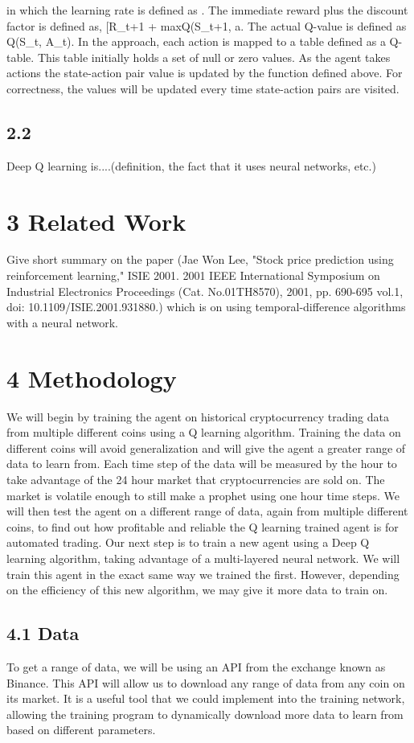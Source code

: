 \documentclass[letterpaper]{article}
\begin{document}
in which the learning rate is defined as \alpha. The immediate reward plus the discount factor is defined as, [R_{t+1} + \gamma maxQ(S_{t+1, a}. The actual Q-value is defined as Q(S_{t}, A_{t}).
In the approach, each action is mapped to a table defined as a Q-table. This table initially holds a set of null or zero values. As the agent takes actions the state-action pair value is updated by the function defined above. For correctness, the values will be updated every time state-action pairs are visited. 

\subsection{2.2} 
Deep Q learning is....(definition, the fact that it uses neural networks, etc.)

\section{3 Related Work}
Give short summary on the paper (Jae Won Lee, "Stock price prediction using reinforcement learning," ISIE 2001. 2001 IEEE International Symposium on Industrial Electronics Proceedings (Cat. No.01TH8570), 2001, pp. 690-695 vol.1, doi: 10.1109/ISIE.2001.931880.) which is on using temporal-difference algorithms with a neural network.

\section{4 Methodology}
We will begin by training the agent on historical cryptocurrency trading data from multiple different coins using a Q learning algorithm. Training the data on different coins will avoid generalization and will give the agent a greater range of data to learn from. Each time step of the data will be measured by the hour to take advantage of the 24 hour market that cryptocurrencies are sold on. The market is volatile enough to still make a prophet using one hour time steps. We will then test the agent on a different range of data, again from multiple different coins, to find out how profitable and reliable the Q learning trained agent is for automated trading. Our next step is to train a new agent using a Deep Q learning algorithm, taking advantage of a multi-layered neural network. We will train this agent in the exact same way we trained the first. However, depending on the efficiency of this new algorithm, we may give it more data to train on.
\subsection{4.1 Data}
To get a range of data, we will be using an API from the exchange known as Binance. This API will allow us to download any range of data from any coin on its market. It is a useful tool that we could implement into the training network, allowing the training program to dynamically download more data to learn from based on different parameters.
\end{document}
